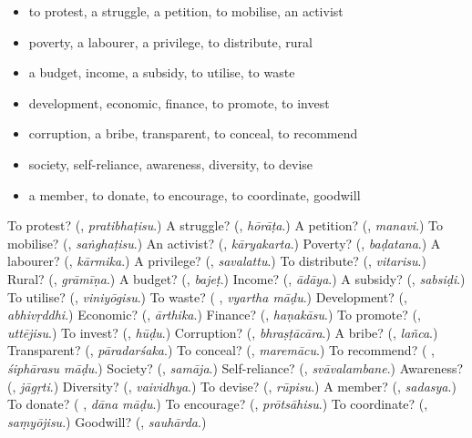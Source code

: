 \begin{itemize}
\raggedright
  \item to protest, a struggle, a petition, to mobilise, an activist
  \item poverty, a labourer, a privilege, to distribute, rural
  \item a budget, income, a subsidy, to utilise, to waste
  \item development, economic, finance, to promote, to invest
  \item corruption, a bribe, transparent, to conceal, to recommend
  \item society, self-reliance, awareness, diversity, to devise
  \item a member, to donate, to encourage, to coordinate, goodwill
\end{itemize}

\begin{tcolorbox}[breakable,colback=teal!4,colframe=teal!35!black,title={Before you move on}]
To protest? (\textbf{}, \emph{pratibhaṭisu}.) A struggle? (\textbf{}, \emph{hōrāṭa}.) A petition? (\textbf{}, \emph{manavi}.) To mobilise? (\textbf{}, \emph{saṅghaṭisu}.) An activist? (\textbf{}, \emph{kāryakarta}.) Poverty? (\textbf{}, \emph{baḍatana}.) A labourer? (\textbf{}, \emph{kārmika}.) A privilege? (\textbf{}, \emph{savalattu}.) To distribute? (\textbf{}, \emph{vitarisu}.) Rural? (\textbf{}, \emph{grāmīṇa}.) A budget? (\textbf{}, \emph{bajeṭ}.) Income? (\textbf{}, \emph{ādāya}.) A subsidy? (\textbf{}, \emph{sabsiḍi}.) To utilise? (\textbf{}, \emph{viniyōgisu}.) To waste? (\textbf{ }, \emph{vyartha māḍu}.) Development? (\textbf{}, \emph{abhivṛddhi}.) Economic? (\textbf{}, \emph{ārthika}.) Finance? (\textbf{}, \emph{haṇakāsu}.) To promote? (\textbf{}, \emph{uttējisu}.) To invest? (\textbf{}, \emph{hūḍu}.) Corruption? (\textbf{}, \emph{bhraṣṭācāra}.) A bribe? (\textbf{}, \emph{lañca}.) Transparent? (\textbf{}, \emph{pāradarśaka}.) To conceal? (\textbf{}, \emph{maremācu}.) To recommend? (\textbf{ }, \emph{śiphārasu māḍu}.) Society? (\textbf{}, \emph{samāja}.) Self-reliance? (\textbf{}, \emph{svāvalambane}.) Awareness? (\textbf{}, \emph{jāgṛti}.) Diversity? (\textbf{}, \emph{vaividhya}.) To devise? (\textbf{}, \emph{rūpisu}.) A member? (\textbf{}, \emph{sadasya}.) To donate? (\textbf{ }, \emph{dāna māḍu}.) To encourage? (\textbf{}, \emph{prōtsāhisu}.) To coordinate? (\textbf{}, \emph{saṃyōjisu}.) Goodwill? (\textbf{}, \emph{sauhārda}.)
\end{tcolorbox}
